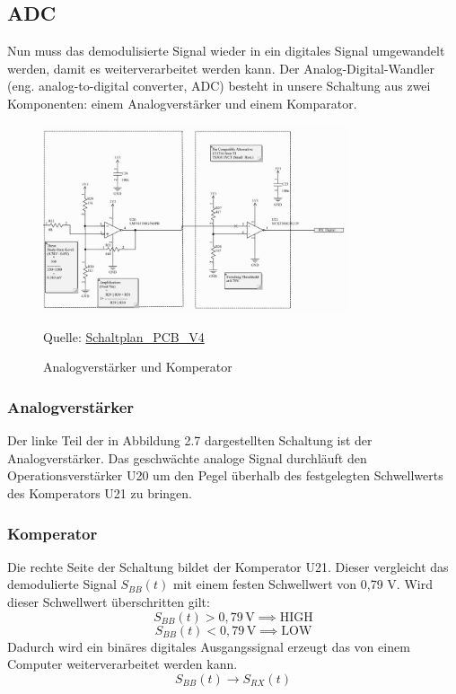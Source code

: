 \subsection{ADC}
Nun muss das demodulisierte Signal wieder in ein digitales Signal umgewandelt werden, damit es weiterverarbeitet werden kann.
Der Analog-Digital-Wandler (eng. analog-to-digital converter, ADC) besteht in unsere Schaltung aus zwei Komponenten: einem Analogverstärker und 
einem Komparator.

\begin{figure}[H]
    \centering
    \includegraphics[width=0.8\textwidth]{Pictures/ADC.jpg}
    \caption{Analogverstärker und Komperator}
    \footnotesize{Quelle: \url{Schaltplan_PCB_V4}}
\end{figure}

\subsubsection{Analogverstärker}
Der linke Teil der in Abbildung 2.7 dargestellten Schaltung ist der Analogverstärker. Das geschwächte analoge Signal durchläuft den 
Operationsverstärker U20 um den Pegel überhalb des festgelegten Schwellwerts des Komperators U21 zu bringen.


\subsubsection{Komperator}
Die rechte Seite der Schaltung bildet der Komperator U21. Dieser vergleicht das demodulierte Signal $S_{BB}(t)$ mit einem festen Schwellwert von 0,79 V.
Wird dieser Schwellwert überschritten gilt:
\[
S_{BB}(t) > 0{,}79\,\mathrm{V} \implies \text{HIGH}
\]
\[
S_{BB}(t) < 0{,}79\,\mathrm{V} \implies \text{LOW}
\]
Dadurch wird ein binäres digitales Ausgangssignal erzeugt das von einem Computer weiterverarbeitet werden kann.
\[
S_{BB}(t) \rightarrow S_{RX}(t)
\]

